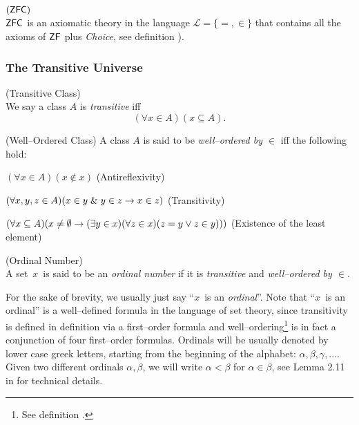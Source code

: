 \begin{definition}{$(\sf{ZFC})$}\label{def:zfc}\\ %
$\sf{ZFC}$ is an axiomatic theory in the language $\mathscr{L} = \{=, \in\}$ that contains all the axioms of $\sf{ZF}$ plus \emph{Choice}, see definition ).
\end{definition}

\subsubsection{The Transitive Universe}
\begin{definition}{(Transitive Class)}\label{def:transitivity}\\ %
We say a class $A$ is \emph{transitive} iff
\begin{equation}
(\forall x \in A)(x \subseteq A)\mbox{.}
\end{equation}
\end{definition}

\begin{definition}{(Well–Ordered Class)}\label{def:well_ordering} %
A class $A$ is said to be \emph{well–ordered by $\in$} iff the following hold:
\bce[(i)]
\item $(\forall x \in A)(x \not\in x)$ (Antireflexivity)
\item $(\forall x, y, z \in A)(x \in y \mathrel{\&} y \in z \rightarrow x \in z)$ (Transitivity)
\item $(\forall x \subseteq A)(x \neq \emptyset \rightarrow (\exists y \in x)(\forall z \in x)(z = y \lor z \in y)))$ (Existence of the least element)
\ece
\end{definition}

\begin{definition}{(Ordinal Number)}\label{def:ordinal}\\ %
A set~$x$~is said to be an \emph{ordinal number} if it is \emph{transitive} and \emph{well–ordered by $\in$}. 
\end{definition}
For the sake of brevity, we usually just say ``$x$~is an \emph{ordinal}''. 
Note that ``$x$~is an ordinal'' is a well–defined formula in the language of set theory, 
since transitivity is defined in definition  via a first–order formula and well–ordering\footnote{See definition .} is in fact a conjunction of four first–order formulas.
Ordinals will be usually denoted by lower case greek letters, starting from the beginning of the alphabet: $\alpha, \beta, \gamma, \ldots$.
Given two different ordinals $\alpha, \beta$, we will write $\alpha < \beta$ for $\alpha \in \beta$, see Lemma 2.11 in \cite{JechBook} for technical details.

